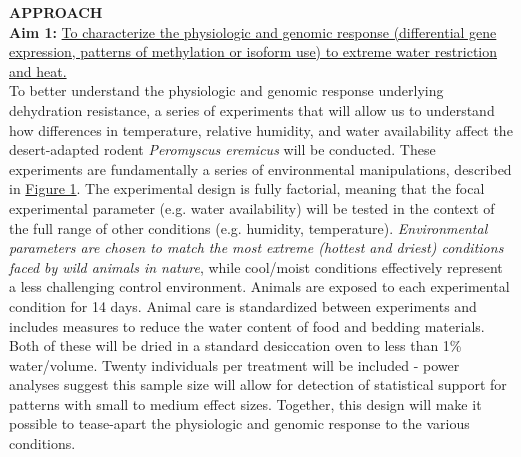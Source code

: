 \documentclass[12pt]{article}
\begin{document}
%
%
% 
%
%
%

\noindent \textbf{APPROACH} \\


\noindent \textbf{Aim 1:} \ul{To characterize the physiologic and genomic response (differential gene expression, patterns of methylation or isoform use) to extreme water restriction and heat.} \\

To better understand the physiologic and genomic response underlying dehydration resistance, a series of experiments that will allow us to understand how differences in temperature, relative humidity, and water availability affect the desert-adapted rodent \textit{Peromyscus eremicus} will be conducted. These experiments are fundamentally a series of environmental manipulations, described in \hyperlink{Figure 1}{Figure 1}. The experimental design is fully factorial, meaning that the focal experimental parameter (e.g. water availability) will be tested in the context of the full range of other conditions (e.g. humidity, temperature). \emph{Environmental parameters are chosen to match the most extreme (hottest and driest) conditions faced by wild animals in nature}, while cool/moist conditions effectively represent a less challenging control environment. Animals are exposed to each experimental condition for 14 days. Animal care is standardized between experiments and includes measures to reduce the water content of food and bedding materials. Both of these will be dried in a standard desiccation oven to less than 1\% water/volume. Twenty individuals per treatment will be included - power analyses suggest this sample size will allow for detection of statistical support for patterns with small to medium effect sizes. Together, this design will make it possible to tease-apart the physiologic and genomic response to the various conditions. \\
\end{document}
